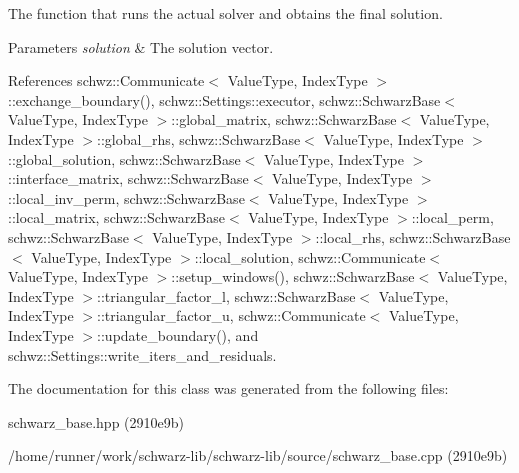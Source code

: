 The function that runs the actual solver and obtains the final solution. 


\begin{DoxyParams}{Parameters}
{\em solution} & The solution vector. \\
\hline
\end{DoxyParams}


References schwz\+::\+Communicate$<$ Value\+Type, Index\+Type $>$\+::exchange\+\_\+boundary(), schwz\+::\+Settings\+::executor, schwz\+::\+Schwarz\+Base$<$ Value\+Type, Index\+Type $>$\+::global\+\_\+matrix, schwz\+::\+Schwarz\+Base$<$ Value\+Type, Index\+Type $>$\+::global\+\_\+rhs, schwz\+::\+Schwarz\+Base$<$ Value\+Type, Index\+Type $>$\+::global\+\_\+solution, schwz\+::\+Schwarz\+Base$<$ Value\+Type, Index\+Type $>$\+::interface\+\_\+matrix, schwz\+::\+Schwarz\+Base$<$ Value\+Type, Index\+Type $>$\+::local\+\_\+inv\+\_\+perm, schwz\+::\+Schwarz\+Base$<$ Value\+Type, Index\+Type $>$\+::local\+\_\+matrix, schwz\+::\+Schwarz\+Base$<$ Value\+Type, Index\+Type $>$\+::local\+\_\+perm, schwz\+::\+Schwarz\+Base$<$ Value\+Type, Index\+Type $>$\+::local\+\_\+rhs, schwz\+::\+Schwarz\+Base$<$ Value\+Type, Index\+Type $>$\+::local\+\_\+solution, schwz\+::\+Communicate$<$ Value\+Type, Index\+Type $>$\+::setup\+\_\+windows(), schwz\+::\+Schwarz\+Base$<$ Value\+Type, Index\+Type $>$\+::triangular\+\_\+factor\+\_\+l, schwz\+::\+Schwarz\+Base$<$ Value\+Type, Index\+Type $>$\+::triangular\+\_\+factor\+\_\+u, schwz\+::\+Communicate$<$ Value\+Type, Index\+Type $>$\+::update\+\_\+boundary(), and schwz\+::\+Settings\+::write\+\_\+iters\+\_\+and\+\_\+residuals.



The documentation for this class was generated from the following files\+:\begin{DoxyCompactItemize}
\item 
schwarz\+\_\+base.\+hpp (2910e9b)\item 
/home/runner/work/schwarz-\/lib/schwarz-\/lib/source/schwarz\+\_\+base.\+cpp (2910e9b)\end{DoxyCompactItemize}
